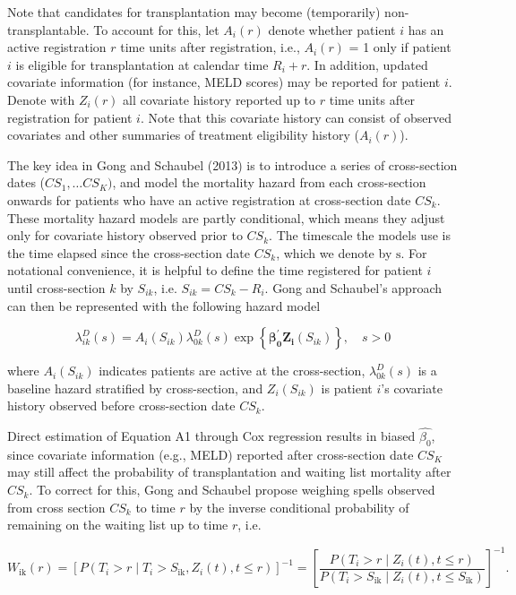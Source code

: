 \documentclass[11pt,twoside,]{book}
\begin{document}
Note that candidates for transplantation may become (temporarily) non-transplantable.
To account for this, let \(A_{i}( r )\) denote whether patient \(i\) has an active registration \(r\) time units after registration, i.e.,
\(A_{i}( r )\) = 1 only if patient \(i\) is eligible
for transplantation at calendar time \(R_{i} + r.\) In addition, updated
covariate information (for instance, MELD scores) may be reported for patient
\(i\). Denote with \(Z_{i}( r )\) all covariate history reported
up to \(r\) time units after registration for patient \({i}\). Note
that this covariate history can consist of observed covariates and other
summaries of treatment eligibility history (\(A_{i}( r )\)).

The key idea in Gong and Schaubel (2013) is to introduce a series
of cross-section dates (\(CS_{1},\ldots CS_{K})\), and model the mortality
hazard from each cross-section onwards for patients who have an active
registration at cross-section date \(CS_k\). These mortality hazard models are partly
conditional, which means they adjust only for covariate history observed prior to
\(CS_{k}\). The timescale the models use is the time elapsed since the cross-section
date \(CS_{k}\), which we denote by \(\text{s}\). For notational
convenience, it is helpful to define the time registered for patient \(i\)
until cross-section \(k\) by \(S_{ik}\), i.e.
\(S_{ik} = CS_{k} - R_{i}.\) Gong and Schaubel's approach can then be
represented with the following hazard model

\[
\lambda_{ik}^{D}( s ) = A_{i}( S_{ik} )\lambda_{0k}^{D}( s )\exp\left\{ \mathbf{\beta}_{\mathbf{0}}^{'}\mathbf{Z}_{\mathbf{i}}( S_{ik} ) \right\},\quad s > 0
\]

where \(A_{i}( S_{ik} )\) indicates patients are active
at the cross-section, \(\lambda_{0k}^{D}( s )\) is a baseline
hazard stratified by cross-section, and
\(Z_{i}( S_{ik} )\) is patient \(i\)'s covariate history
observed before cross-section date \(CS_{k}\).

Direct estimation of Equation A1 through Cox regression results in biased
\(\widehat{\beta_{0}}\), since covariate information (e.g., MELD) reported
after cross-section date \(CS_{K}\) may still affect the probability of
transplantation and waiting list mortality after \(CS_{k}\). To correct for
this, Gong and Schaubel propose weighing spells observed from cross
section \(CS_{k}\) to time \(r\) by the inverse conditional probability of
remaining on the waiting list up to time \(r\), i.e.

\[W_{\text{ik}}\left( r \right) = \left\lbrack P\left( T_{i} > r \middle| T_{i} > S_{\text{ik}},Z_{i}\left( t \right),t \leq r \right) \right\rbrack^{- 1} = \left\lbrack \frac{P\left( T_{i} > r \middle| Z_{i}\left( t \right),t \leq r \right)}{P\left( T_{i} > S_{\text{ik}} \middle| Z_{i}\left( t \right),t \leq S_{\text{ik}} \right)} \right\rbrack^{- 1}.\]
\end{document}
